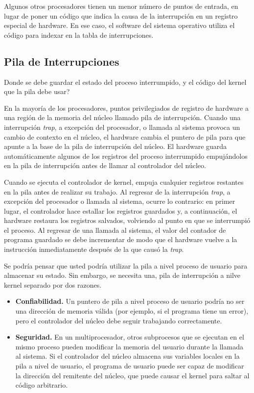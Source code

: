 \documentclass[10pt]{book}
\begin{document}
Algunos otros procesadores tienen un menor número de puntos de entrada, en lugar de poner un código que indica la causa de la interrupción en un registro especial de hardware. En ese caso, el software del sistema operativo utiliza el código para indexar en la tabla de interrupciones.

\subsection{Pila de Interrupciones}
Donde se debe guardar el estado del proceso interrumpido, y el código del kernel que la pila debe usar?

En la mayoría de los procesadores, puntos privilegiados de registro de hardware a una región de la memoria del núcleo llamado pila de interrupción. Cuando una interrupción \textit{trap}, a excepción del procesador, o llamada al sistema provoca un cambio de contexto en el núcleo, el hardware cambia el puntero de pila para que apunte a la base de la pila de interrupción del núcleo. El hardware guarda automáticamente algunos de los registros del proceso interrumpido empujándolos en la pila de interrupción antes de llamar al controlador del núcleo.

Cuando se ejecuta el controlador de kernel, empuja cualquier registros restantes en la pila antes de realizar su trabajo. Al regresar de la interrupción \textit{trap}, a excepción del procesador o llamada al sistema, ocurre lo contrario: en primer lugar, el controlador hace estallar los registros guardados y, a continuación, el hardware restaura los registros salvados, volviendo al punto en que se interrumpió el proceso. Al regresar de una llamada al sistema, el valor del contador de programa guardado se debe incrementar de modo que el hardware vuelve a la instrucción inmediatamente después de la que causó la \textit{trap}.

Se podría pensar que usted podría utilizar la pila a nivel proceso de usuario para almacenar su estado. Sin embargo, se necesita una, pila de interrupción a nilve kernel separado por dos razones.

\begin{itemize}
\item \textbf{Confiabilidad.} Un puntero de pila a nivel proceso de usuario podría no ser una dirección de memoria válida (por ejemplo, si el programa tiene un error), pero el controlador del núcleo debe seguir trabajando correctamente.

\item \textbf{Seguridad.} En un multiprocesador, otros subprocesos que se ejecutan en el mismo proceso pueden modificar la memoria del usuario durante la llamada al sistema. Si el controlador del núcleo almacena sus variables locales en la pila a nivel de usuario, el programa de usuario puede ser capaz de modificar la dirección del remitente del núcleo, que puede causar el kernel para saltar al código arbitrario.
\end{itemize}
\end{document}
